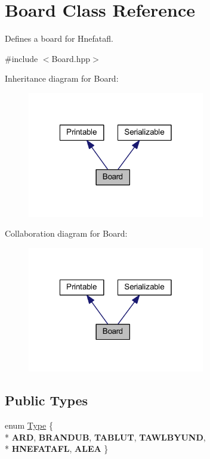 \hypertarget{class_board}{\section{Board Class Reference}
\label{class_board}
}


Defines a board for Hnefatafl.  




{\ttfamily \#include $<$Board.\-hpp$>$}



Inheritance diagram for Board\-:\nopagebreak
\begin{figure}[H]
\begin{center}
\leavevmode
\includegraphics[width=219pt]{class_board__inherit__graph}
\end{center}
\end{figure}


Collaboration diagram for Board\-:\nopagebreak
\begin{figure}[H]
\begin{center}
\leavevmode
\includegraphics[width=219pt]{class_board__coll__graph}
\end{center}
\end{figure}
\subsection*{Public Types}
\begin{DoxyCompactItemize}
\item 
enum \hyperlink{class_board_a7a90fdd0f301fc502684108416605644}{Type} \{ \\*
{\bfseries A\-R\-D}, 
{\bfseries B\-R\-A\-N\-D\-U\-B}, 
{\bfseries T\-A\-B\-L\-U\-T}, 
{\bfseries T\-A\-W\-L\-B\-Y\-U\-N\-D}, 
\\*
{\bfseries H\-N\-E\-F\-A\-T\-A\-F\-L}, 
{\bfseries A\-L\-E\-A}
 \}
\end{DoxyCompactItemize}
